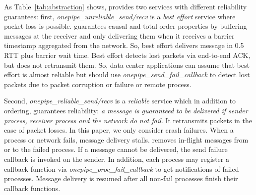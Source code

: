 As Table~\ref{tab:abstraction} shows, \sys{} provides two services with different reliability guarantees: first, \textit{onepipe\_unreliable\_send/recv} is a \emph{best effort} service where packet loss is possible. \sys{} guarantees causal and total order properties by buffering messages at the receiver and only delivering them when it receives a barrier timestamp aggregated from the network. So, best effort \sys{} delivers message in 0.5 RTT plus barrier wait time. %
Best effort \sys{} detects lost packets via end-to-end ACK, but does not retransmit them. 
So, data center applications can assume that best effort \sys{} is almost reliable but should use \textit{onepipe\_send\_fail\_callback} to detect lost packets due to packet corruption or failure  or remote process. 

Second, \textit{onepipe\_reliable\_send/recv} is a \emph{reliable} service which in addition to ordering, guarantees reliability: \emph{a message is guaranteed to be delivered if sender process, receiver process and the network do not fail}. It retransmits packets in the case of packet losses. In this paper, we only consider crash failures. When a process or network fails, message delivery stalls.
\sys{} removes in-flight messages from or to the failed process.
If a message cannot be delivered, the send failure callback is invoked on the sender.
In addition, each process may register a callback function via \textit{onepipe\_proc\_fail\_callback} to get notifications of failed processes. Message delivery is resumed after all non-fail processes finish their callback functions.


